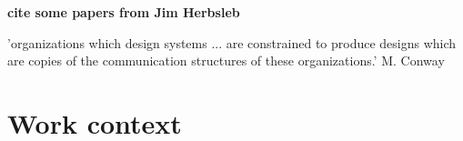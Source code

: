 \documentclass[12pt, letterpaper]{article}
\newcommand{\todo}[1]
  {{\scriptsize \textbf{\color{red} {#1}}}}
\begin{document}
\cite{Newell06} 

\cite{Steinmacher12} 

\cite{Dagenais10} 

\cite{Razavi06} 

\cite{Whitworth06} 

\todo{cite some papers from Jim Herbsleb}


'organizations which design systems ... are constrained to produce designs which are copies of the communication structures of these organizations.' M. Conway
 
 


 
\section{Work context}
\end{document}
